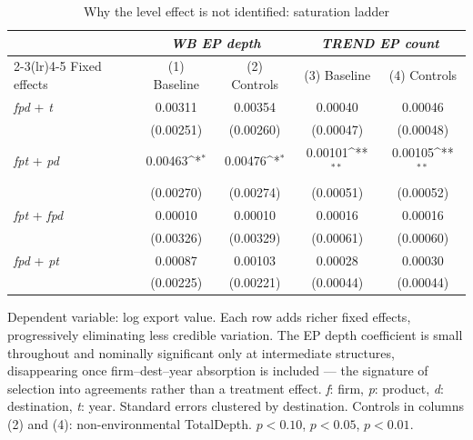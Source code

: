 \begin{table}[htbp]
\centering
\footnotesize
\caption{Why the level effect is not identified: saturation ladder}
\label{tab:ladder}
\begin{threeparttable}
{
\def\sym#1{\ifmmode^{#1}\else\(^{#1}\)\fi}
\begin{tabular}{lcccc}
\toprule
 & \multicolumn{2}{c}{\textit{WB EP depth}} & \multicolumn{2}{c}{\textit{TREND EP count}} \\
\cmidrule(lr){2-3}\cmidrule(lr){4-5}
Fixed effects & (1) Baseline & (2) Controls & (3) Baseline & (4) Controls \\
\midrule
\textit{fpd} + \textit{t} & 0.00311 & 0.00354 & 0.00040 & 0.00046 \\
 & (0.00251) & (0.00260) & (0.00047) & (0.00048) \\
\addlinespace
\textit{fpt} + \textit{pd} & 0.00463\sym{*} & 0.00476\sym{*} & 0.00101\sym{**} & 0.00105\sym{**} \\
 & (0.00270) & (0.00274) & (0.00051) & (0.00052) \\
\addlinespace
\textit{fpt} + \textit{fpd} & 0.00010 & 0.00010 & 0.00016 & 0.00016 \\
 & (0.00326) & (0.00329) & (0.00061) & (0.00060) \\
\addlinespace
\textit{fpd} + \textit{pt} & 0.00087 & 0.00103 & 0.00028 & 0.00030 \\
 & (0.00225) & (0.00221) & (0.00044) & (0.00044) \\
\bottomrule
\end{tabular}
}
\begin{tablenotes}[flushleft]\footnotesize
\item Dependent variable: log export value. Each row adds richer fixed effects, progressively eliminating less credible variation. The EP depth coefficient is small throughout and nominally significant only at intermediate structures, disappearing once firm--dest--year absorption is included --- the signature of selection into agreements rather than a treatment effect. \textit{f}: firm, \textit{p}: product, \textit{d}: destination, \textit{t}: year. Standard errors clustered by destination. Controls in columns (2) and (4): non-environmental TotalDepth. \sym{*} $p<0.10$, \sym{**} $p<0.05$, \sym{***} $p<0.01$.
\end{tablenotes}
\end{threeparttable}
\end{table}
